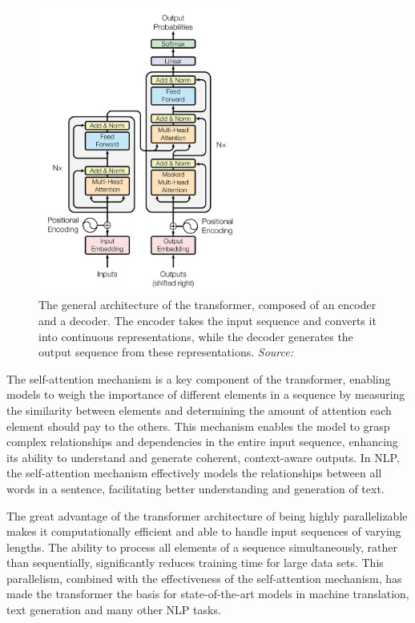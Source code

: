 \begin{figure}[h!]
    \centering
    \includegraphics[width=0.6\textwidth]{images/llms/transformer-architecture.png}
    \caption{The general architecture of the transformer, composed of an encoder and a decoder. The encoder takes the input sequence and converts it into continuous representations, while the decoder generates the output sequence from these representations. \textit{Source:} \cite{vaswani2017attention}}
    \label{fig:transformer-architecture}
\end{figure}

The self-attention mechanism is a key component of the transformer, enabling models to weigh the importance of different elements in a sequence by measuring the similarity between elements and determining the amount of attention each element should pay to the others. This mechanism enables the model to grasp complex relationships and dependencies in the entire input sequence, enhancing its ability to understand and generate coherent, context-aware outputs. In NLP, the self-attention mechanism effectively models the relationships between all words in a sentence, facilitating better understanding and generation of text.

The great advantage of the transformer architecture of being highly parallelizable makes it computationally efficient and able to handle input sequences of varying lengths. The ability to process all elements of a sequence simultaneously, rather than sequentially, significantly reduces training time for large data sets. This parallelism, combined with the effectiveness of the self-attention mechanism, has made the transformer the basis for state-of-the-art models in machine translation, text generation and many other NLP tasks.

